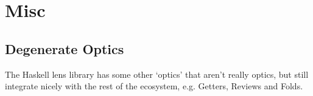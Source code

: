 \documentclass[11pt,a4paper]{article}
\makeatletter
\theoremstyle{plain}
\newtheorem{theorem}{Theorem}[subsection]
\theoremstyle{definition}
\newcommand{\C}{\mathscr{C}}
\newcommand{\M}{\mathscr{M}}
\newcommand{\id}{\mathrm{id}}
\newcommand{\hto}{\ensuremath{\,\mathaccent\shortmid\rightarrow\,}}
\providecommand{\leftsquigarrow}{%
  \mathrel{\mathpalette\reflect@squig\relax}%
}
\newcommand{\reflect@squig}[2]{%
  \reflectbox{$\m@th#1\rightsquigarrow$}%
}
\newcommand{\todo}[1]{\textcolor{red}{\small #1}}
\makeatother
\begin{document}

\section{Misc}
\subsection{Degenerate Optics}
The Haskell lens library has some other `optics' that aren't really optics, but still integrate nicely with the rest of the ecosystem, e.g. Getters, Reviews and Folds.
\end{document}
